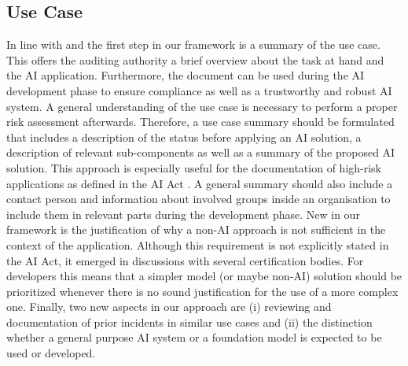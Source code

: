 \subsection{Use Case}

In line with \cite{Raji2020_Accountability} and \cite{poretschkin2021_IAIS_Leitfaden} the first step in our framework is a summary of the use case. This offers the auditing authority a brief overview about the task at hand and the AI application. Furthermore, the document can be used during the AI development phase to ensure compliance as well as a trustworthy and robust AI system. A general understanding of the use case is necessary to perform a proper risk assessment afterwards. Therefore, a use case summary should be formulated that includes a description of the status before applying an AI solution, a description of relevant sub-components as well as a summary of the proposed AI solution. This approach is especially useful for the documentation of high-risk applications as defined in the AI Act \citep{AiAct}. A general summary should also include a contact person and information about involved groups inside an organisation to include them in relevant parts during the development phase. New in our framework is the justification of why a non-AI approach is not sufficient in the context of the application. Although this requirement is not explicitly stated in the AI Act, it emerged in discussions with several certification bodies. For developers this means that a simpler model (or maybe non-AI) solution should be prioritized whenever there is no sound justification for the use of a more complex one. Finally, two new aspects in our approach are (i) reviewing and documentation of prior incidents in similar use cases and (ii) the distinction whether a general purpose AI system or a foundation model is expected to be used or developed. 


